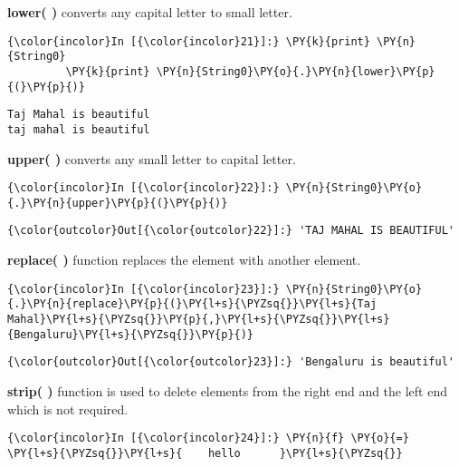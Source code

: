     \textbf{lower( )} converts any capital letter to small letter.

    \begin{Verbatim}[commandchars=\\\{\}]
{\color{incolor}In [{\color{incolor}21}]:} \PY{k}{print} \PY{n}{String0}
         \PY{k}{print} \PY{n}{String0}\PY{o}{.}\PY{n}{lower}\PY{p}{(}\PY{p}{)}
\end{Verbatim}

    \begin{Verbatim}[commandchars=\\\{\}]
Taj Mahal is beautiful
taj mahal is beautiful
    \end{Verbatim}

    \textbf{upper( )} converts any small letter to capital letter.

    \begin{Verbatim}[commandchars=\\\{\}]
{\color{incolor}In [{\color{incolor}22}]:} \PY{n}{String0}\PY{o}{.}\PY{n}{upper}\PY{p}{(}\PY{p}{)}
\end{Verbatim}

            \begin{Verbatim}[commandchars=\\\{\}]
{\color{outcolor}Out[{\color{outcolor}22}]:} 'TAJ MAHAL IS BEAUTIFUL'
\end{Verbatim}
        
    \textbf{replace( )} function replaces the element with another element.

    \begin{Verbatim}[commandchars=\\\{\}]
{\color{incolor}In [{\color{incolor}23}]:} \PY{n}{String0}\PY{o}{.}\PY{n}{replace}\PY{p}{(}\PY{l+s}{\PYZsq{}}\PY{l+s}{Taj Mahal}\PY{l+s}{\PYZsq{}}\PY{p}{,}\PY{l+s}{\PYZsq{}}\PY{l+s}{Bengaluru}\PY{l+s}{\PYZsq{}}\PY{p}{)}
\end{Verbatim}

            \begin{Verbatim}[commandchars=\\\{\}]
{\color{outcolor}Out[{\color{outcolor}23}]:} 'Bengaluru is beautiful'
\end{Verbatim}
        
    \textbf{strip( )} function is used to delete elements from the right end
and the left end which is not required.

    \begin{Verbatim}[commandchars=\\\{\}]
{\color{incolor}In [{\color{incolor}24}]:} \PY{n}{f} \PY{o}{=} \PY{l+s}{\PYZsq{}}\PY{l+s}{    hello      }\PY{l+s}{\PYZsq{}}
\end{Verbatim}


